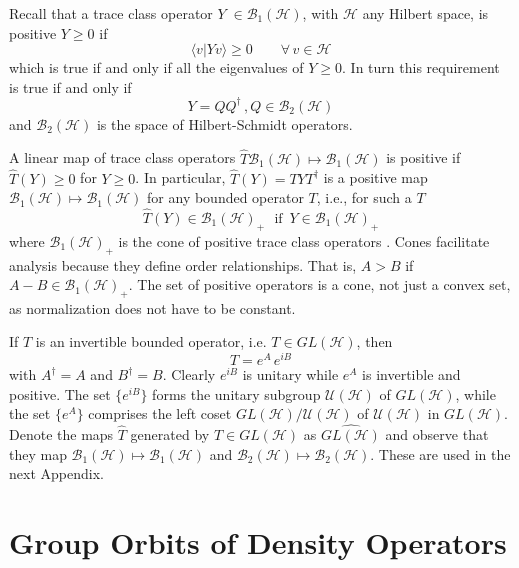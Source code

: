 \documentclass[aps,preprint]{revtex4}%
\begin{document}
\noindent Recall that a trace class operator $Y \; \in\mathcal{B}_{1} (
\mathcal{H})$, with $\mathcal{H}$ any Hilbert space, is positive $Y \ge0$ if
\begin{equation}
\langle v | Y v \rangle\ge0 \qquad\forall\, v \in\mathcal{H}%
\end{equation}
which is true if and only if all the eigenvalues of $Y \ge0$. In turn this
requirement is true if and only if
\begin{equation}
Y = Q Q^{\dagger} \, , Q\in\mathcal{B}_{2} ( \mathcal{H})
\end{equation}
and $\mathcal{B}_{2} ( \mathcal{H})$ is the space of Hilbert-Schmidt operators.

A linear map of trace class operators $\hat{T}\mathcal{B}_{1}(\mathcal{H}%
)\mapsto\mathcal{B}_{1}(\mathcal{H})$ is positive if $\hat{T}(Y)\geq0$ for
$Y\geq0$. In particular, $\hat{T}(Y)=TYT^{\dagger}$ is a positive map
$\mathcal{B}_{1}(\mathcal{H})\mapsto\mathcal{B}_{1}(\mathcal{H})$ for any
bounded operator $T$, i.e., for such a $T$
\begin{equation}
\hat{T}(Y)\in\mathcal{B}_{1}(\mathcal{H})_{+}\,\,\text{{\ if }}\,Y\in
\mathcal{B}_{1}(\mathcal{H})_{+}%
\end{equation}
where $\mathcal{B}_{1}(\mathcal{H})_{+}$ is the cone of positive trace class
operators \cite{Kummer}. Cones facilitate analysis because they define order
relationships. That is, $A>B$ if $A-B\in\mathcal{B}_{1}(\mathcal{H})_{+}$. The
set of positive operators is a cone, not just a convex set, as normalization
does not have to be constant.

If $T$ is an invertible bounded operator, i.e. $T\in GL(\mathcal{H})$, then
\begin{equation}
T=e^{A}\,e^{iB}%
\end{equation}
with $A^{\dagger}=A$ and $B^{\dagger}=B$. Clearly $e^{iB}$ is unitary while
$e^{A}$ is invertible and positive. The set $\{e^{iB}\}$ forms the unitary
subgroup $\mathcal{U}(\mathcal{H})$ of $GL(\mathcal{H})$, while the set $\{
e^{A}\}$ comprises the left coset $GL(\mathcal{H})/\mathcal{U}(\mathcal{H})$
of $\mathcal{U}(\mathcal{H})$ in $GL(\mathcal{H})$. Denote the maps $\hat{T}$
generated by $T\in GL(\mathcal{H})$ as $\widehat{GL(\mathcal{H})}$ and observe
that they map $\mathcal{B}_{1}(\mathcal{H})\mapsto\mathcal{B}_{1}%
(\mathcal{H})$ and $\mathcal{B}_{2}(\mathcal{H})\mapsto\mathcal{B}%
_{2}(\mathcal{H}).$ These are used in the next Appendix.

\section{Group Orbits of Density Operators}
\end{document}
